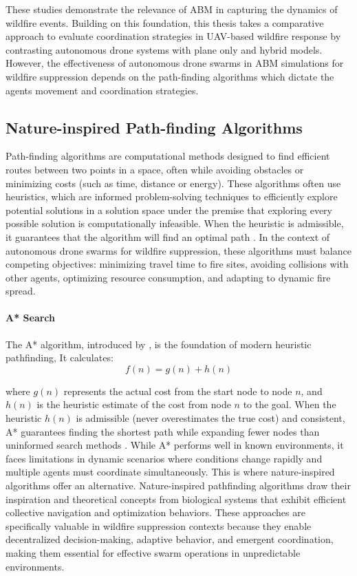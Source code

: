 \documentclass[twoside]{article}
\begin{document}
These studies demonstrate the relevance of ABM in capturing the dynamics of wildfire events. Building on this foundation, this thesis takes a comparative approach to evaluate coordination strategies in UAV-based wildfire response by contrasting autonomous drone systems with plane only and hybrid models. However, the effectiveness of autonomous drone swarms in ABM simulations for wildfire suppression depends on the path-finding algorithms which dictate the agents movement and coordination strategies.

\subsection{Nature-inspired Path-finding Algorithms}

Path-finding algorithms are computational methods designed to find efficient routes between two points in a space, often while avoiding obstacles or minimizing costs (such as time, distance or energy). These algorithms often use heuristics, which are informed problem-solving techniques to efficiently explore potential solutions in a solution space under the premise that exploring every possible solution is computationally infeasible. When the heuristic is admissible, it guarantees that the algorithm will find an optimal path \citep{heuristic}.
In the context of autonomous drone swarms for wildfire suppression, these algorithms must balance competing objectives: minimizing travel time to fire sites, avoiding collisions with other agents, optimizing resource consumption, and adapting to dynamic fire spread.

\paragraph{A* Search} The A* algorithm, introduced by \citet*{heuristic}, is the foundation of modern heuristic pathfinding, It calculates:
\begin{equation}
    f(n) = g(n) + h(n)
\end{equation}

where $g(n)$ represents the actual cost from the start node to node $n$, and $h(n)$ is the heuristic estimate of the cost from node $n$ to the goal. When the heuristic $h(n)$ is admissible (never overestimates the true cost) and consistent, A* guarantees finding the shortest path while expanding fewer nodes than uninformed search methods \citep{heuristic}. 
While A* performs well in known environments, it faces limitations in dynamic scenarios where conditions change rapidly and multiple agents must coordinate simultaneously. This is where nature-inspired algorithms offer an alternative.
Nature-inspired pathfinding algorithms draw their inspiration and theoretical concepts from biological systems that exhibit efficient collective navigation and optimization behaviors. These approaches are specifically valuable in wildfire suppression contexts because they enable decentralized decision-making, adaptive behavior, and emergent coordination, making them essential for effective swarm operations in unpredictable environments.
\end{document}
